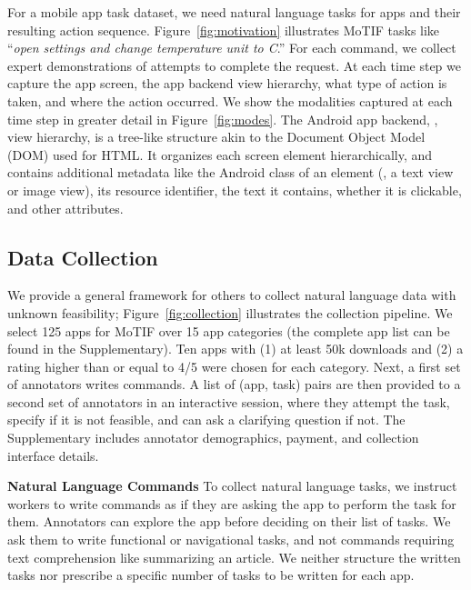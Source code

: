 For a mobile app task dataset, we need natural language tasks for apps and their resulting action sequence. Figure~\ref{fig:motivation} illustrates MoTIF tasks like ``\textit{open settings and change temperature unit to C}.'' For each command, we collect expert demonstrations of attempts to complete the request. At each time step we capture the app screen, the app backend view hierarchy, what type of action is taken, and where the action occurred. We show the modalities captured at each time step in greater detail in Figure~\ref{fig:modes}. The Android app backend, \ie, view hierarchy, is a tree-like structure akin to the Document Object Model (DOM) used for HTML. It organizes each screen element hierarchically, and contains additional metadata like the Android class of an element (\eg, a text view or image view), its resource identifier, the text it contains, whether it is clickable, and other attributes.

\subsection{Data Collection}
\label{sec:data}

We provide a general framework for others to collect natural language data with unknown feasibility; Figure~\ref{fig:collection} illustrates the collection pipeline. We select 125 apps for MoTIF over 15 app categories (the complete app list can be found in the Supplementary). 
Ten apps with (1) at least 50k downloads and (2) a rating higher than or equal to 4/5 were chosen for each category.
Next, a first set of annotators writes commands. A list of (app, task) pairs are then provided to a second set of annotators in an interactive session,
where they attempt the task, specify if it is not feasible, and can ask a clarifying question if not. 
The Supplementary includes annotator demographics, payment, and collection interface details. 

\smallskip
 
\noindent\textbf{Natural Language Commands}
\label{nlanns}
To collect natural language tasks, we instruct workers to write commands as if they are asking the app to perform the task for them.
Annotators can explore the app before deciding on their list of tasks. We ask them to write functional or navigational tasks, and not commands requiring text comprehension like summarizing an article.
We neither structure the written tasks nor prescribe a specific number of tasks to be written for each app.
\smallskip

